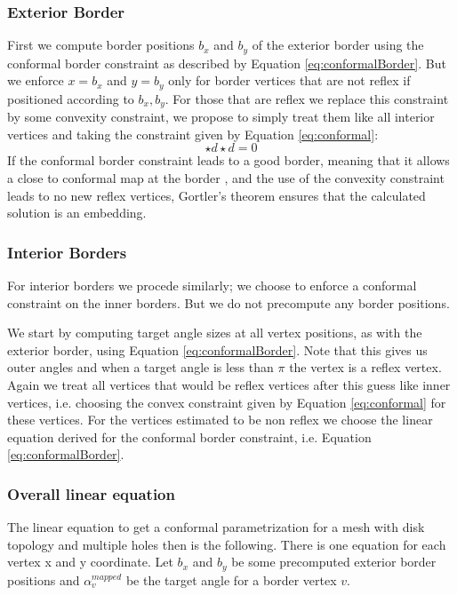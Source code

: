 \subsubsection{Exterior Border}
First we compute border positions $b_x$ and $b_y$ of the exterior border using the conformal border constraint as described by Equation \ref{eq:conformalBorder}. But we enforce $x = b_x$ and $y= b_y$ only for border vertices that are not reflex if positioned according to $b_x, b_y$. For those that are reflex we replace this constraint by some convexity constraint, we propose to simply treat them like all interior vertices and taking the constraint given by Equation \ref{eq:conformal}:
\[\star d\star d = 0\]  
If the conformal border constraint leads to a good border, meaning that it allows a close to conformal map at the border , and the use of the convexity constraint leads to no new reflex vertices, Gortler's theorem ensures that the calculated solution is an embedding.

\subsubsection{Interior Borders}
For interior borders we procede similarly; we choose to enforce a conformal constraint on the inner borders. But we do not precompute any border positions.

We start by computing target angle sizes at all vertex positions, as with the exterior border, using Equation \ref{eq:conformalBorder}. Note that this gives us outer angles  and when a target angle is less than $\pi$ the vertex is a reflex vertex. Again we treat all vertices that would be reflex vertices after this guess like inner vertices, i.e. choosing the convex constraint given by Equation \ref{eq:conformal} for these vertices. For the vertices estimated to be non reflex we choose the linear equation derived for the conformal border constraint, i.e. Equation \ref{eq:conformalBorder}.

\subsubsection{Overall linear equation}
The linear equation to get a conformal parametrization for a mesh with disk topology and multiple holes then is the following.
There is one equation for each vertex x and y coordinate. Let $b_x$ and $b_y$ be some precomputed exterior border positions and $\alpha_v^{mapped}$ be the target angle for a border vertex $v$.


